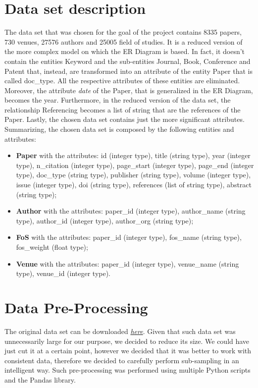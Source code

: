 \documentclass{Configuration_Files/PoliMi3i_thesis}
\begin{document}
\section{Data set description}
The data set that was chosen for the goal of the project contains 8335 papers, 730 venues, 27576 authors and 25005 field of studies. It is a reduced version of the more complex model on which the ER Diagram is based. In fact, it doesn't contain the entities Keyword and the sub-entities Journal, Book, Conference and Patent that, instead, are transformed into an attribute of the entity Paper that is called doc\_type. All the respective attributes of these entities are eliminated. Moreover, the attribute \textit{date} of the Paper, that is generalized in the ER Diagram, becomes the year. Furthermore, in the reduced version of the data set, the relationship Referencing becomes a list of string that are the references of the Paper. Lastly, the chosen data set contains just the more significant attributes. 
Summarizing, the chosen data set is composed by the following entities and attributes:
\begin{itemize}
    \item \textbf{Paper} with the attributes: id (integer type), title (string type), year (integer type), n\_citation (integer type), page\_start (integer type), page\_end (integer type), doc\_type (string type), publisher (string type), volume (integer type), issue (integer type), doi (string type), references (list of string type), abstract (string type);
    \item \textbf{Author} with the attributes: paper\_id (integer type), author\_name (string type), author\_id (integer type), author\_org (string type);
    \item \textbf{FoS} with the attributes: paper\_id (integer type), fos\_name (string type), fos\_weight (float type);
    \item \textbf{Venue} with the attributes: paper\_id (integer type), venue\_name (string type), venue\_id (integer type).
\end{itemize}
\section{Data Pre-Processing}
The original data set can be downloaded \href{https://lfs.aminer.cn/misc/dblp.v11.zip}{\textit{here}}. 
Given that such data set was unnecessarily large for our purpose, we decided to reduce its size. We could have just cut it at a certain point, however we decided that it was better to work with consistent data, therefore we decided to carefully perform sub-sampling in an intelligent way. Such pre-processing was performed using multiple Python scripts and the Pandas library. 
\end{document}
